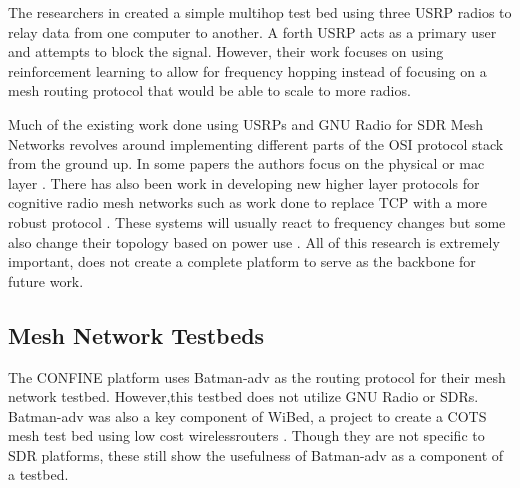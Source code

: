 The researchers in \cite{7141228} created a simple multihop test bed using three USRP radios to relay data from one computer to another. A forth USRP acts as a primary user and attempts to block the signal. However, their work focuses on using reinforcement learning to allow for frequency hopping instead of focusing on a mesh routing protocol that would be able to scale to more radios. 

Much of the existing work done using USRPs and GNU Radio for SDR Mesh Networks revolves around implementing different parts of the OSI protocol stack from the ground up. In some papers the authors focus on the physical or mac layer \cite{5508221}. There has also been work in developing new higher layer protocols for cognitive radio mesh networks such as work done to replace TCP with a more robust protocol \cite{6686523}. These systems will usually react to frequency changes but some also change their topology based on power use \cite{6983150}. All of this research is extremely important, does not create a complete platform to serve as the backbone for future work. 

\subsection{Mesh Network Testbeds}

The CONFINE platform uses Batman-adv as the routing protocol for their mesh network testbed. However,this testbed does not utilize GNU Radio or SDRs. \cite{0001} Batman-adv was also a key component of WiBed, a project to create a COTS mesh test bed using low cost wirelessrouters \cite{6686492} \cite{6962154}. Though they are not specific to SDR platforms, these still show the usefulness of Batman-adv as a component of a testbed. 